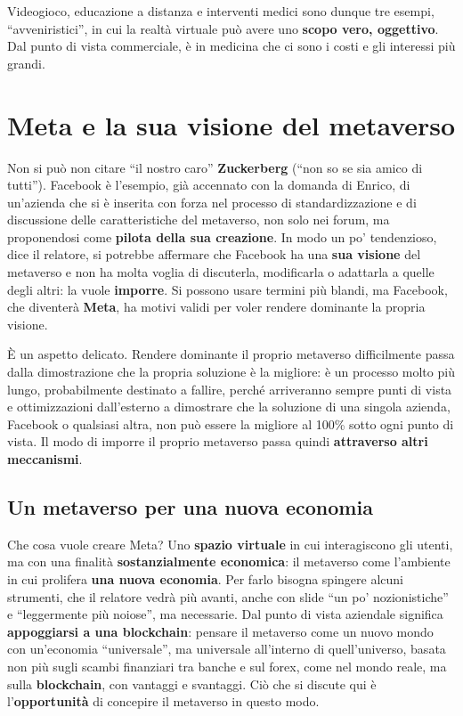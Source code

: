 Videogioco, educazione a distanza e interventi medici sono dunque tre esempi,
``avveniristici'', in cui la realtà virtuale può avere uno \textbf{scopo vero,
oggettivo}. Dal punto di vista commerciale, è in medicina che ci sono i costi e
gli interessi più grandi.

\section{Meta e la sua visione del metaverso}
\label{z8:sec:meta}

Non si può non citare ``il nostro caro'' \textbf{Zuckerberg} (``non so se sia
amico di tutti''). Facebook è l'esempio, già accennato con la domanda di Enrico,
di un'azienda che si è inserita con forza nel processo di standardizzazione e di
discussione delle caratteristiche del metaverso, non solo nei forum, ma
proponendosi come \textbf{pilota della sua creazione}. In modo un po'
tendenzioso, dice il relatore, si potrebbe affermare che Facebook ha una
\textbf{sua visione} del metaverso e non ha molta voglia di discuterla,
modificarla o adattarla a quelle degli altri: la vuole \textbf{imporre}. Si
possono usare termini più blandi, ma Facebook, che diventerà \textbf{Meta}, ha
motivi validi per voler rendere dominante la propria visione.

È un aspetto delicato. Rendere dominante il proprio metaverso difficilmente
passa dalla dimostrazione che la propria soluzione è la migliore: è un processo
molto più lungo, probabilmente destinato a fallire, perché arriveranno sempre
punti di vista e ottimizzazioni dall'esterno a dimostrare che la soluzione di
una singola azienda, Facebook o qualsiasi altra, non può essere la migliore al
100\% sotto ogni punto di vista. Il modo di imporre il proprio metaverso passa
quindi \textbf{attraverso altri meccanismi}.

\subsection{Un metaverso per una nuova economia}

Che cosa vuole creare Meta? Uno \textbf{spazio virtuale} in cui interagiscono gli
utenti, ma con una finalità \textbf{sostanzialmente economica}: il metaverso
come l'ambiente in cui prolifera \textbf{una nuova economia}. Per farlo bisogna
spingere alcuni strumenti, che il relatore vedrà più avanti, anche con slide
``un po' nozionistiche'' e ``leggermente più noiose'', ma necessarie. Dal punto
di vista aziendale significa \textbf{appoggiarsi a una blockchain}: pensare il
metaverso come un nuovo mondo con un'economia ``universale'', ma universale
all'interno di quell'universo, basata non più sugli scambi finanziari tra banche
e sul forex, come nel mondo reale, ma sulla \textbf{blockchain}, con vantaggi e
svantaggi. Ciò che si discute qui è l'\textbf{opportunità} di concepire il
metaverso in questo modo.

